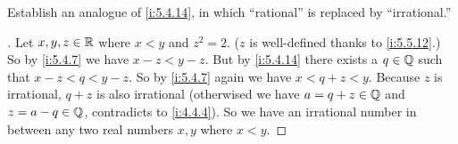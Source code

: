 \begin{ex}\label{i:ex:5.5.5}
  Establish an analogue of \cref{i:5.4.14}, in which ``rational'' is replaced by ``irrational.''
\end{ex}

\begin{proof}[]
  Let \(x, y, z \in \mathbb{R}\) where \(x < y\) and \(z^2 = 2\).
  (\(z\) is well-defined thanks to \cref{i:5.5.12}.)
  So by \cref{i:5.4.7} we have \(x - z < y - z\).
  But by \cref{i:5.4.14} there exists a \(q \in \mathbb{Q}\) such that \(x - z < q < y - z\).
  So by \cref{i:5.4.7} again we have \(x < q + z < y\).
  Because \(z\) is irrational, \(q + z\) is also irrational
  (otherwised we have \(a = q + z \in \mathbb{Q}\) and \(z = a - q \in \mathbb{Q}\), contradicts to \cref{i:4.4.4}).
  So we have an irrational number in between any two real numbers \(x, y\) where \(x < y\).
\end{proof}
